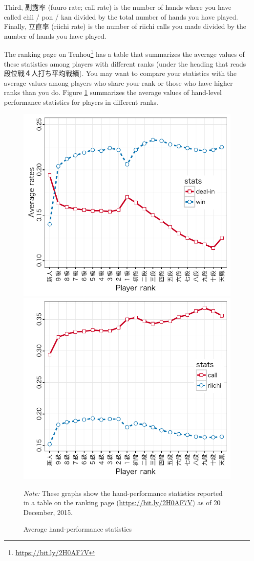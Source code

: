 \bigskip
Third, 副露率 ({\jap fuuro} rate; call rate) is the number of hands where you have called {\jap chii} / {\jap pon} / {\jap kan} divided by the total number of hands you have played. Finally, 立直率 (riichi rate) is the number of riichi calls you made divided by the number of hands you have played. 

\bigskip

The ranking page on {\jap Tenhou}\footnote{\url{https://bit.ly/2H0AF7V}} has a table that summarizes the average values of these statistics among players with different ranks (under the heading that reads 段位戦４人打ち平均戦績). You may want to compare your statistics with the average values among players who share your rank or those who have higher ranks than you do. Figure \ref{fig:avg} summarizes the average values of hand-level performance statistics for players in different ranks. 

\begin{figure}[t!] \captionsetup{font=small}
\begin{center}
\includegraphics[width=.50\textwidth,clip]{figs/stats_wd.pdf}\hspace{-7pt}
\includegraphics[width=.50\textwidth,clip]{figs/stats_cr.pdf}
\vspace{-10pt}
\caption{Average hand-performance statistics}\label{fig:avg}
\end{center}\vspace{-10pt}
{\footnotesize \textit{Note:} These graphs show the hand-performance statistics reported in a table on the ranking page (\url{https://bit.ly/2H0AF7V}) as of 20 December, 2015.}
\end{figure}

